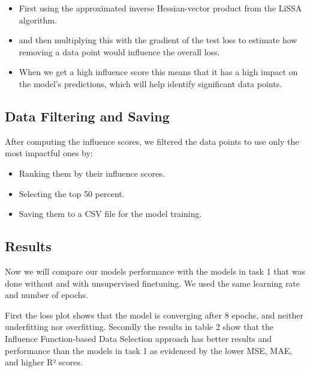 \documentclass[11pt]{article}
\begin{document}
\begin{itemize}
    \item First using the approximated inverse Hessian-vector product from the LiSSA algorithm.
    \item and then multiplying this with the gradient of the test loss to estimate how removing a data point would influence the overall loss.
    \item When we get a high influence score this means that it has a high impact on the model's predictions, which will help identify significant data points.
\end{itemize}

\subsection{Data Filtering and Saving}
After computing the influence scores, we filtered the data points to use only the most impactful ones by:

\begin{itemize}
    \item Ranking them by their influence scores.
    \item Selecting the top 50 percent.
    \item Saving them to a CSV file for the model training.
\end{itemize}


\subsection{Results}
Now we will compare our models performance with the models in task 1 that was done without and with unsupervised finetuning. We used the same learning rate and number of epochs. 

First the loss plot shows that the model is converging after 8 epochs, and neither underfitting nor overfitting. Secondly the results in table 2 show that the  Influence Function-based Data Selection approach has better results and performance than the models in task 1 as evidenced by the lower MSE, MAE, and higher R² scores.
\end{document}
